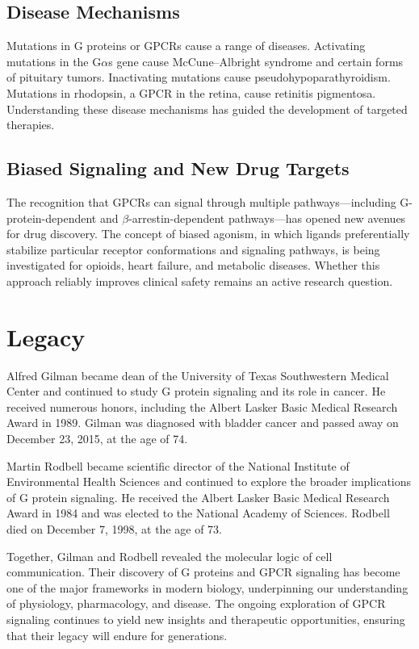 \subsection{Disease Mechanisms}

Mutations in G proteins or GPCRs cause a range of diseases. Activating mutations in the G$\alpha$s gene cause McCune--Albright syndrome and certain forms of pituitary tumors. Inactivating mutations cause pseudohypoparathyroidism. Mutations in rhodopsin, a GPCR in the retina, cause retinitis pigmentosa. Understanding these disease mechanisms has guided the development of targeted therapies.

\subsection{Biased Signaling and New Drug Targets}

The recognition that GPCRs can signal through multiple pathways---including G-protein-dependent and $\beta$-arrestin-dependent pathways---has opened new avenues for drug discovery. The concept of biased agonism, in which ligands preferentially stabilize particular receptor conformations and signaling pathways, is being investigated for opioids, heart failure, and metabolic diseases. Whether this approach reliably improves clinical safety remains an active research question.

\section{Legacy}

Alfred Gilman became dean of the University of Texas Southwestern Medical Center and continued to study G protein signaling and its role in cancer. He received numerous honors, including the Albert Lasker Basic Medical Research Award in 1989. Gilman was diagnosed with bladder cancer and passed away on December 23, 2015, at the age of 74.

Martin Rodbell became scientific director of the National Institute of Environmental Health Sciences and continued to explore the broader implications of G protein signaling. He received the Albert Lasker Basic Medical Research Award in 1984 and was elected to the National Academy of Sciences. Rodbell died on December 7, 1998, at the age of 73.

Together, Gilman and Rodbell revealed the molecular logic of cell communication. Their discovery of G proteins and GPCR signaling has become one of the major frameworks in modern biology, underpinning our understanding of physiology, pharmacology, and disease. The ongoing exploration of GPCR signaling continues to yield new insights and therapeutic opportunities, ensuring that their legacy will endure for generations.


